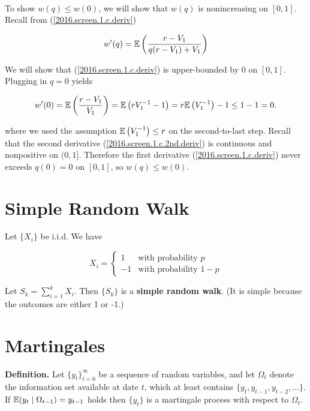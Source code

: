 \begin{solution}
\begin{enumerate}[(a)]
\

To show \(w(q) \leq w(0)\), we will show that \(w(q)\) is nonincreasing on \([0, 1]\). Recall from (\ref{2016.screen.1.c.deriv}) 

\[
w'(q) = \mathbb{E}  \left( \frac{r - V_1}{q(r - V_1) + V_1} \right)
\]

We will show that (\ref{2016.screen.1.c.deriv}) is upper-bounded by 0 on \([0,1]\). Plugging in \(q = 0\) yields

\[
w'(0) = \mathbb{E}  \left( \frac{r - V_1}{ V_1} \right) = \mathbb{E}  \left( r V_1^{-1} - 1 \right)  = r \mathbb{E}  \left(V_1^{-1}\right)  - 1 \leq 1 - 1 = 0.
\]

where we used the assumption \(\mathbb{E}\left(V_1^{-1}\right)  \leq r\) on the second-to-last step. Recall that the second derivative (\ref{2016.screen.1.c.2nd.deriv}) is continuous and nonpositive on \((0,1]\). Therefore the first derivative (\ref{2016.screen.1.c.deriv}) never exceeds \(q(0) = 0\) on \([0,1]\), so \(w(q) \leq w(0)\).


\end{enumerate}

\end{solution}



\section{Simple Random Walk}

\begin{definition}\label{sp.srw} Let \(\{X_i\}\) be i.i.d. We have

\[
X_i = \begin{cases}
1 & \text{with probability } p \\
-1 & \text{with probability } 1 - p
\end{cases}
\]

Let \(S_k = \sum_{i=1}^k X_i\). Then \(\{S_k\}\) is a \textbf{simple random walk}. (It is simple because the outcomes are either 1 or -1.)

\end{definition}

\section{Martingales}

\textbf{Definition.} Let \(\{y_t\}_{t=0}^\infty \) be a sequence of random variables, and let \(\Omega_t\) denote the information set available at date \(t\), which at least contains \(\{y_t, y_{t-1}, y_{t-2}, \ldots \}\). If \(\mathbb{E}(y_t \mid \Omega_{t-1}) = y_{t-1}\) holds then \(\{y_t\}\) is a martingale process with respect to \(\Omega_t\).

